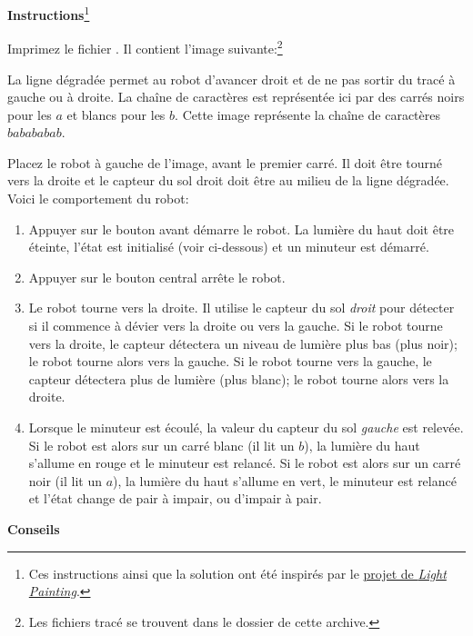 \textbf{Instructions}\footnote{Ces instructions ainsi que la solution ont été inspirés par
le \href{https://www.thymio.org/fr:barcodelightpainting}{projet de \textit{Light Painting}}.}

Imprimez le fichier .
Il contient l'image suivante:\footnote{Les fichiers tracé se trouvent dans le dossier  de cette archive.}


La ligne dégradée permet au robot d'avancer droit et de ne pas sortir du tracé à gauche ou à droite.
La chaîne de caractères est représentée ici par des carrés noirs pour les $a$ et blancs pour les $b$.
Cette image représente la chaîne de caractères $babababab$.

Placez le robot à gauche de l'image, avant le premier carré.
Il doit être tourné vers la droite et le capteur du sol droit doit être au milieu de la ligne dégradée.
Voici le comportement du robot:

\begin{enumerate}

\item Appuyer sur le bouton avant démarre le robot. La lumière du haut doit être éteinte,
l'état est initialisé (voir ci-dessous) et un minuteur est démarré.

\item Appuyer sur le bouton central arrête le robot.

\item Le robot tourne vers la droite.
Il utilise le capteur du sol \emph{droit} pour détecter si il commence à dévier vers la droite ou
vers la gauche.
Si le robot tourne vers la droite, le capteur détectera un niveau de lumière plus bas (plus noir);
le robot tourne alors vers la gauche.
Si le robot tourne vers la gauche, le capteur détectera plus de lumière (plus blanc);
le robot tourne alors vers la droite.

\item Lorsque le minuteur est écoulé, la valeur du capteur du sol \emph{gauche} est relevée.
Si le robot est alors sur un carré blanc (il lit un $b$), la lumière du haut s'allume en rouge
et le minuteur est relancé.
Si le robot est alors sur un carré noir (il lit un $a$), la lumière du haut s'allume en vert,
le minuteur est relancé et l'état change de pair à impair, ou d'impair à pair.

\end{enumerate}

\textbf{Conseils}

